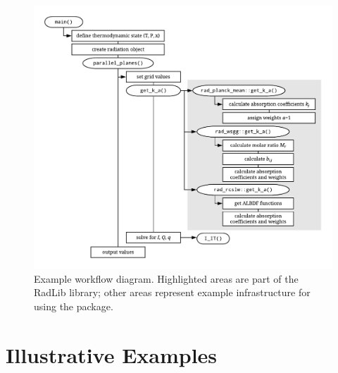 \documentclass[preprint,12pt, a4paper]{elsarticle}
\begin{document}
\begin{figure}
	\begin{center}
		\includegraphics[width=\textwidth]{../figures/radlib_structure.pdf}
	\end{center}
	\caption{Example workflow diagram. Highlighted areas are part of the RadLib library; other areas represent example infrastructure for using the package.}
\label{fig:flowchart}
\end{figure}


\section{Illustrative Examples}
\label{s:Examples}
\end{document}
